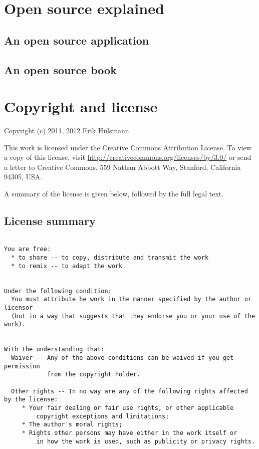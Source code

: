 \chapter{Open source explained}

\section{An open source application}

\section{An open source book}


\chapter{Copyright and license}

Copyright (c) 2011, 2012 Erik H\"ulsmann.


This work is licensed under the Creative Commons Attribution License.
To view a copy of this license, visit \url{http://creativecommons.org/licenses/by/3.0/}
or send a letter to Creative Commons, 559 Nathan Abbott Way,
Stanford, California 94305, USA.

A summary of the license is given below, followed by the full legal text.

\section{License summary}

\begin{verbatim}

You are free:
  * to share -- to copy, distribute and transmit the work
  * to remix -- to adapt the work


Under the following condition:
  You must attribute he work in the manner specified by the author or licensor
  (but in a way that suggests that they endorse you or your use of the work).


With the understanding that:
  Waiver -- Any of the above conditions can be waived if you get permission
            from the copyright holder.
  
  Other rights -- In no way are any of the following rights affected by the license:
     * Your fair dealing or fair use rights, or other applicable 
         copyright exceptions and limitations;
     * The author's moral rights;
     * Rights other persons may have either in the work itself or
         in how the work is used, such as publicity or privacy rights.



\end{verbatim}



